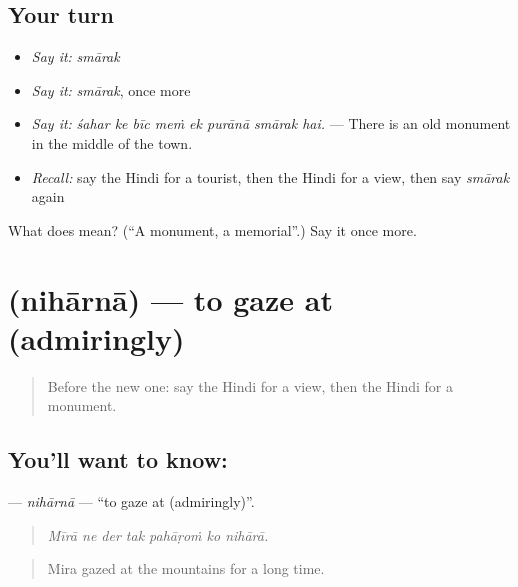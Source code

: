 \subsection*{Your turn}
\begin{itemize}
\raggedright
  \item \emph{Say it:} \emph{smārak}
  \item \emph{Say it:} \emph{smārak}, once more
  \item \emph{Say it:} \emph{śahar ke bīc meṁ ek purānā smārak hai.} — There is an old monument in the middle of the town.
  \item \emph{Recall:} say the Hindi for a tourist, then the Hindi for a view, then say \emph{smārak} again
\end{itemize}

\begin{tcolorbox}[breakable,colback=teal!4,colframe=teal!35!black,title={Before you move on}]
What does  mean? (\textquotedblleft{}A monument, a memorial\textquotedblright{}.) Say it once more.
\end{tcolorbox}
\section[\texorpdfstring{\hi{निहारना} (nihārnā)}{निहारना (nihārnā)}]{ (nihārnā) — to gaze at (admiringly)}

\label{lesson:HI-C451-niharna}



\begin{quote}
Before the new one: say the Hindi for a view, then the Hindi for a monument.
\end{quote}

\subsection*{You'll want to know: }
\textbf{} — \emph{nihārnā} — \textquotedblleft{}to gaze at (admiringly)\textquotedblright{}.

\begin{quote}
      
\end{quote}

\begin{quote}
\emph{Mīrā ne der tak pahāṛoṁ ko nihārā.}
\end{quote}

\begin{quote}
Mira gazed at the mountains for a long time.
\end{quote}

